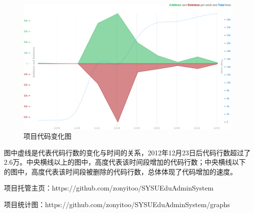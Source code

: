 \begin{figure}[H]
   \centering \includegraphics[width=\textwidth]{img/code_freq.png}
   \caption{项目代码变化图}
\end{figure}

图中虚线是代表代码行数的变化与时间的关系，2012年12月23日后代码行数超过了2.6万。中央横线以上的图中，高度代表该时间段增加的代码行数；中央横线以下的图中，高度代表该时间段被删除的代码行数，总体体现了代码增加的速度。\vspace{2em}

项目托管主页：https://github.com/zonyitoo/SYSUEduAdminSystem

项目统计图：https://github.com/zonyitoo/SYSUEduAdminSystem/graphs
